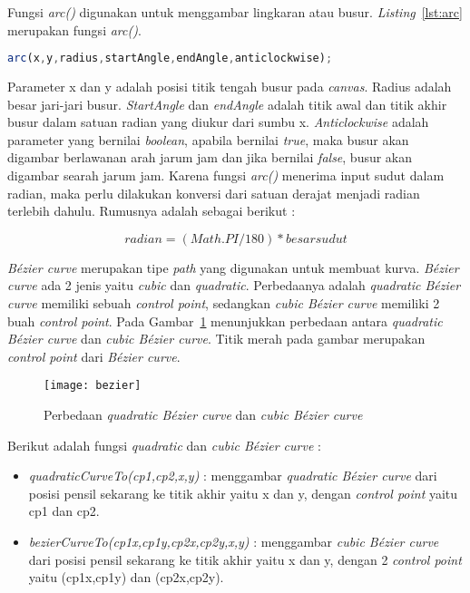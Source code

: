 Fungsi \textit{arc()} digunakan untuk menggambar lingkaran atau busur. \textit{Listing}~\ref{lst:arc} merupakan fungsi \textit{arc()}.

\begin{lstlisting}[language=Javascript, caption=Fungsi \textit{arc()}, label={lst:arc}]
	arc(x,y,radius,startAngle,endAngle,anticlockwise);
\end{lstlisting}

Parameter x dan y adalah posisi titik tengah busur pada \textit{canvas}. Radius adalah besar jari-jari busur. \textit{StartAngle} dan \textit{endAngle} adalah titik awal dan titik akhir busur dalam satuan radian yang diukur dari sumbu x. \textit{Anticlockwise} adalah parameter yang bernilai \textit{boolean}, apabila bernilai \textit{true}, maka busur akan digambar berlawanan arah jarum jam dan jika bernilai \textit{false}, busur akan digambar searah jarum jam. Karena fungsi \textit{arc()} menerima input sudut dalam radian, maka perlu dilakukan konversi dari satuan derajat menjadi radian terlebih dahulu. Rumusnya adalah sebagai berikut :

\begin{displaymath}
	radian = (Math.PI / 180) * besar sudut
\end{displaymath}	

\textit{B\'ezier curve} merupakan tipe \textit{path} yang digunakan untuk membuat kurva. \textit{B\'ezier curve} ada 2 jenis yaitu \textit{cubic} dan \textit{quadratic}. Perbedaanya adalah \textit{quadratic B\'ezier curve} memiliki sebuah \textit{control point}, sedangkan \textit{cubic B\'ezier curve} memiliki 2 buah \textit{control point}. Pada Gambar~\ref{fig:bezier} menunjukkan perbedaan antara \textit{quadratic B\'ezier curve} dan \textit{cubic B\'ezier curve}. Titik merah pada gambar merupakan \textit{control point} dari \textit{B\'ezier curve}.

\begin{figure}[H]
	\centering  
	\texttt{[image: bezier]}
	\caption[Perbedaan \textit{quadratic B\'ezier curve} dan \textit{cubic B\'ezier curve}]{Perbedaan \textit{quadratic B\'ezier curve} dan \textit{cubic B\'ezier curve}\cite{MDN:05:Web}}
	\label{fig:bezier} 
\end{figure} 

Berikut adalah fungsi \textit{quadratic} dan \textit{cubic B\'ezier curve} :
\begin{itemize}
	\item \textit{quadraticCurveTo(cp1,cp2,x,y)} : menggambar \textit{quadratic B\'ezier curve} dari posisi pensil sekarang ke titik akhir yaitu x dan y, dengan \textit{control point} yaitu cp1 dan cp2.
	\item \textit{bezierCurveTo(cp1x,cp1y,cp2x,cp2y,x,y)} : menggambar \textit{cubic B\'ezier curve} dari posisi pensil sekarang ke titik akhir yaitu x dan y, dengan 2  \textit{control point} yaitu (cp1x,cp1y) dan (cp2x,cp2y).
\end{itemize}

